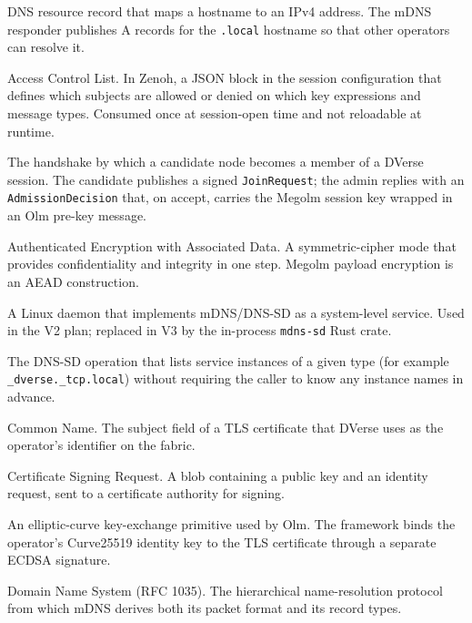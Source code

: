 \documentclass[11pt,a4paper]{article}
\begin{document}
\begin{description}[leftmargin=2.6cm, style=nextline, font=\sffamily\bfseries]
  \item[A record] DNS resource record that maps a hostname to
        an IPv4 address. The mDNS responder publishes A
        records for the \texttt{.local} hostname so that other
        operators can resolve it.
  \item[ACL] Access Control List. In Zenoh, a JSON block in
        the session configuration that defines which subjects
        are allowed or denied on which key expressions and
        message types. Consumed once at session-open time and
        not reloadable at runtime.
  \item[admission] The handshake by which a candidate node
        becomes a member of a DVerse session. The candidate
        publishes a signed \texttt{JoinRequest}; the admin
        replies with an \texttt{AdmissionDecision} that, on
        accept, carries the Megolm session key wrapped in an
        Olm pre-key message.
  \item[AEAD] Authenticated Encryption with Associated Data.
        A symmetric-cipher mode that provides confidentiality
        and integrity in one step. Megolm payload encryption
        is an AEAD construction.
  \item[Avahi] A Linux daemon that implements mDNS/DNS-SD as
        a system-level service. Used in the V2 plan; replaced
        in V3 by the in-process \texttt{mdns-sd} Rust crate.
  \item[browse] The DNS-SD operation that lists service
        instances of a given type (for example
        \texttt{\_dverse.\_tcp.local}) without requiring the
        caller to know any instance names in advance.
  \item[CN] Common Name. The subject field of a TLS
        certificate that DVerse uses as the operator's
        identifier on the fabric.
  \item[CSR] Certificate Signing Request. A blob containing a
        public key and an identity request, sent to a
        certificate authority for signing.
  \item[Curve25519] An elliptic-curve key-exchange primitive
        used by Olm. The framework binds the operator's
        Curve25519 identity key to the TLS certificate through
        a separate ECDSA signature.
  \item[DNS] Domain Name System (RFC 1035). The hierarchical
        name-resolution protocol from which mDNS derives both
        its packet format and its record types.

\end{description}
\end{document}

